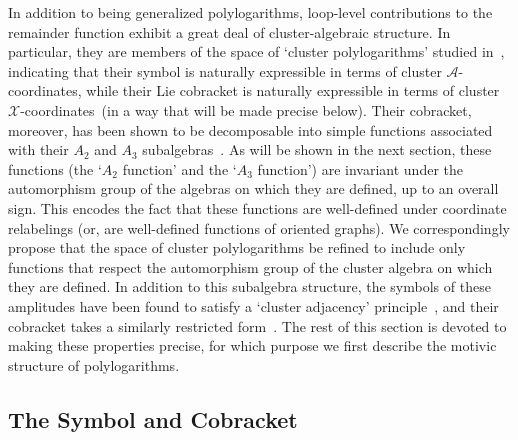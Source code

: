 \documentclass[12pt]{article}
\def\xcoords{$\mathcal{X}$-coordinates}
\def\acoords{$\mathcal{A}$-coordinates}
\begin{document}
In addition to being generalized polylogarithms, loop-level contributions to the remainder function exhibit a great deal of cluster-algebraic structure. In particular, they are members of the space of `cluster polylogarithms' studied in~\cite{Golden:2014xqa}, indicating that their symbol is naturally expressible in terms of cluster \acoords, while their Lie cobracket is naturally expressible in terms of cluster \xcoords\ (in a way that will be made precise below). Their cobracket, moreover, has been shown to be decomposable into simple functions associated with their $A_2$ and $A_3$ subalgebras~\cite{Golden:2014xqa}. As will be shown in the next section, these functions (the `$A_2$ function' and the `$A_3$ function') are invariant under the automorphism group of the algebras on which they are defined, up to an overall sign. This encodes the fact that these functions are well-defined under coordinate relabelings (or, are well-defined functions of oriented graphs). We correspondingly propose that the space of cluster polylogarithms be refined to include only functions that respect the automorphism group of the cluster algebra on which they are defined. In addition to this subalgebra structure, the symbols of these amplitudes have been found to satisfy a `cluster adjacency' principle~\cite{Drummond:2017ssj}, and their cobracket takes a similarly restricted form~\cite{Golden:2014xqf}. The rest of this section is devoted to making these properties precise, for which purpose we first describe the motivic structure of polylogarithms. 

\subsection{The Symbol and Cobracket} \label{sec:coproduct}
\end{document}

